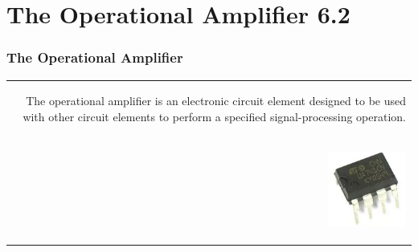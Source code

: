 \documentclass[aspectratio=169]{beamer}
\begin{document}
\section{The Operational Amplifier 6.2}
\begin{frame}[fragile]
\frametitle{The Operational Amplifier}
\begin{tabular}{r}
	\begin{columns}	\column{1\textwidth}
	The operational amplifier is an electronic circuit element designed to be used with other circuit elements to perform a specified signal-processing operation.

	\end{columns} \\
	\begin{columns}
		\begin{column}{.22\textwidth}  %
			\begin{center}
			\includegraphics[height=2.5cm]{figure34.png}
			\end{center}			


\end{column}
\end{columns}
\end{tabular}
\end{frame}
\end{document}
